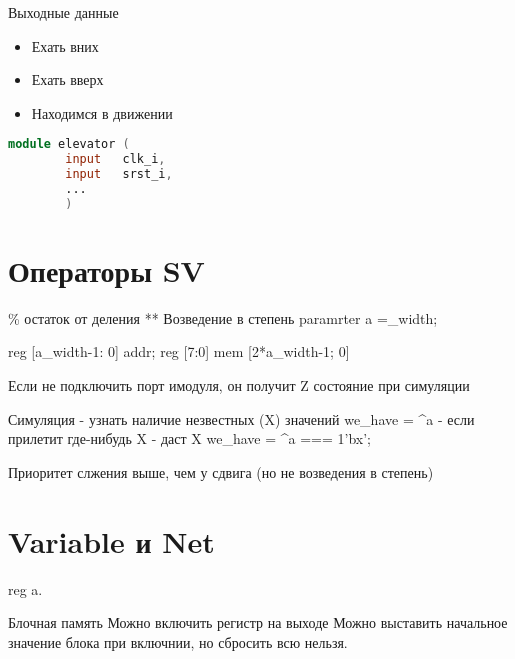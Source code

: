 \documentclass[a4paper, 12pt]{extarticle}
\begin{document}
		Выходные данные
		\begin{itemize}
			\item Ехать вних
			\item Ехать вверх
			\item Находимся в движении
		\end{itemize}

	\begin{lstlisting}[language=Verilog]
		module elevator (
		input	clk_i,
		input	srst_i,
		...
		)
	\end{lstlisting}


\section{Операторы SV}
	\% остаток от деления
	** Возведение  в степень
	paramrter a =_width;

	reg [a_width-1: 0] addr;
	reg [7:0] mem [2*a_width-1; 0]

	Если не подключить порт имодуля, он получит Z состояние при симуляции

	Симуляция - узнать наличие незвестных (X) значений
	we_have = ^a - если прилетит где-нибудь X -  даст X
	we_have = ^a === 1'bx';

	Приоритет слжения выше, чем у сдвига (но не возведения в степень)


\section{Variable и Net}
	reg a.

Блочная память
	Можно включить регистр на выходе
	Можно выставить начальное значение блока при включнии, но сбросить всю нельзя.
\end{document}
